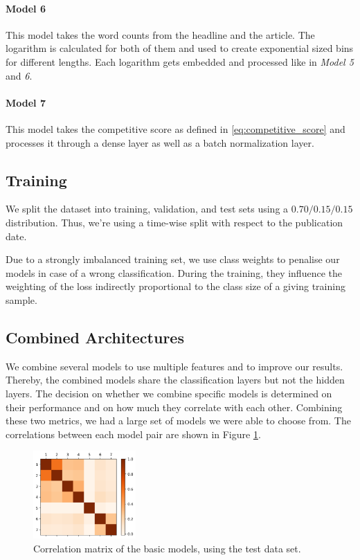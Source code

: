 \paragraph{Model 6} 
This model takes the word counts from the headline and the article.
The logarithm is calculated for both of them and used to create exponential sized bins for different lengths.
Each logarithm gets embedded and processed like in \textit{Model 5} and \textit{6}.

\paragraph{Model 7} 
This model takes the competitive score as defined in \autoref{eq:competitive_score} and processes it through a dense layer as well as a batch normalization layer.

\subsection{Training}
We split the dataset into training, validation, and test sets using a $0.70/0.15/0.15$ distribution.
Thus, we're using a time-wise split with respect to the publication date.

Due to a strongly imbalanced training set, we use class weights to penalise our models in case of a wrong classification.
During the training, they influence the weighting of the loss indirectly proportional to the class size of a giving training sample.

\subsection{Combined Architectures}
We combine several models to use multiple features and to improve our results.
Thereby, the combined models share the classification layers but not the hidden layers.
The decision on whether we combine specific models is determined on their performance and on how much they correlate with each other.
Combining these two metrics, we had a large set of models we were able to choose from.
The correlations between each model pair are shown in Figure \ref{fig:correlation_matrix}. 

\begin{figure}[h]
	\includegraphics[width=0.35\textwidth]{fig/correlations.png}
	\caption{\textmd{Correlation matrix of the basic models, using the test data set.}}
	\label{fig:correlation_matrix}
\end{figure}